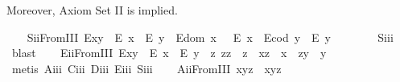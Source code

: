 \begin{isabellebody}
\endisatagproof
{\isafoldproof}%
%
\isadelimproof
%
\endisadelimproof
%
\begin{isamarkuptext}%
Moreover, Axiom Set II is implied.%
\end{isamarkuptext}\isamarkuptrue%
\ \ \isamarkupfalse%
\ S\isactrlsub i\isactrlsub iFromIII{\isacharcolon}\ {\isachardoublequoteopen}{\isacharparenleft}E{\isacharparenleft}x{\isasymcdot}y{\isacharparenright}\ \isactrlbold {\isasymrightarrow}\ {\isacharparenleft}E\ x\ \isactrlbold {\isasymand}\ E\ y{\isacharparenright}{\isacharparenright}\ \isactrlbold {\isasymand}\ {\isacharparenleft}E{\isacharparenleft}dom\ x\ {\isacharparenright}\ \isactrlbold {\isasymrightarrow}\ E\ x{\isacharparenright}\ \isactrlbold {\isasymand}\ {\isacharparenleft}E{\isacharparenleft}cod\ y{\isacharparenright}\ \isactrlbold {\isasymrightarrow}\ E\ y{\isacharparenright}{\isachardoublequoteclose}\ \ \isanewline
%
\isadelimproof
\ \ \ \ %
\endisadelimproof
%
\isatagproof
{}\isamarkupfalse%
\ S\isactrlsub i\isactrlsub i\isactrlsub i\ \isamarkupfalse%
\ blast%
\endisatagproof
{\isafoldproof}%
%
\isadelimproof
\isanewline
%
\endisadelimproof
\ \ \isamarkupfalse%
\ E\isactrlsub i\isactrlsub iFromIII{\isacharcolon}\ {\isachardoublequoteopen}E{\isacharparenleft}x{\isasymcdot}y{\isacharparenright}\ \isactrlbold {\isasymleftarrow}\ {\isacharparenleft}E\ x\ \isactrlbold {\isasymand}\ E\ y\ \isactrlbold {\isasymand}\ {\isacharparenleft}\isactrlbold {\isasymexists}z{\isachardot}\ z{\isasymcdot}z\ {\isasymcong}\ z\ \isactrlbold {\isasymand}\ x{\isasymcdot}z\ {\isasymcong}\ x\ \isactrlbold {\isasymand}\ z{\isasymcdot}y\ {\isasymcong}\ y{\isacharparenright}{\isacharparenright}{\isachardoublequoteclose}\ \isanewline
%
\isadelimproof
\ \ \ \ %
\endisadelimproof
%
\isatagproof
{}\isamarkupfalse%
\ {\isacharparenleft}metis\ A\isactrlsub i\isactrlsub i\isactrlsub i\ C\isactrlsub i\isactrlsub i\isactrlsub i\ D\isactrlsub i\isactrlsub i\isactrlsub i\ E\isactrlsub i\isactrlsub i\isactrlsub i\ S\isactrlsub i\isactrlsub i\isactrlsub i{\isacharparenright}%
\endisatagproof
{\isafoldproof}%
%
\isadelimproof
\isanewline
%
\endisadelimproof
\ \ \isamarkupfalse%
\ A\isactrlsub i\isactrlsub iFromIII{\isacharcolon}\ {\isachardoublequoteopen}x{\isasymcdot}{\isacharparenleft}y{\isasymcdot}z{\isacharparenright}\ {\isasymcong}\ {\isacharparenleft}x{\isasymcdot}y{\isacharparenright}{\isasymcdot}z{\isachardoublequoteclose}\ \isanewline
%
\isadelimproof
\ \ \ \ %
\endisadelimproof
%
\isatagproof
{}\isamarkupfalse%

\end{isabellebody}
